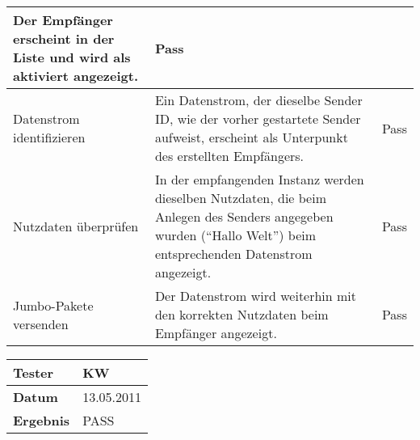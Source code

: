 \begin{table}[h]
\begin{center}
\begin{tabular}{|p{4cm}|p{7.8cm}|p{2.3cm}|}
                    Der Empfänger erscheint in der Liste und wird als
                    aktiviert angezeigt.& Pass\\
                \hline
                    Datenstrom identifizieren &
                    Ein Datenstrom, der dieselbe Sender ID, wie der vorher
                    gestartete Sender aufweist, erscheint als Unterpunkt des
                    erstellten Empfängers.& Pass\\
                \hline
                    Nutzdaten überprüfen &
                    In der empfangenden Instanz werden dieselben Nutzdaten, die
                    beim Anlegen des Senders angegeben wurden ("`Hallo Welt"')
                    beim entsprechenden Datenstrom angezeigt.& Pass\\
                \hline
                    Jumbo-Pakete versenden &
                    Der Datenstrom wird weiterhin mit den korrekten Nutzdaten
                    beim Empfänger angezeigt.& Pass\\
                \hline
            \end{tabular}
                   \begin{tabular}{|p{3.5cm}|p{11cm}|}
                \textbf{Tester} & KW\\
                \hline
                \textbf{Datum} & 13.05.2011\\
                \hline
                \textbf{Ergebnis} & PASS\\
                \hline
            \end{tabular}
        \end{center}
    \end{table}

